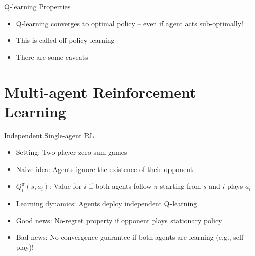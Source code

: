 \documentclass[11pt,aspectratio=169]{beamer}
\begin{document}
  
  \begin{frame}{Q-learning Properties}
   \begin{itemize}
   \setlength{\itemsep}{1em}
    \item Q-learning converges to optimal policy -- even if agent acts sub-optimally!
    \item This is called \alert{off-policy learning}
    \item There are some caveats
   \end{itemize}
  \end{frame}
  
  
 \section{Multi-agent Reinforcement Learning}
  
  
  \begin{frame}{Independent Single-agent RL}
   \begin{itemize}[<+->]
   \setlength{\itemsep}{1.2em}
    \item Setting: Two-player zero-sum games
    \item Naive idea: Agents \alert{ignore} the existence of their opponent
    \item $Q_i^\pi(s,a_i)$: Value for $i$ if both agents follow $\pi$ starting from $s$ and $i$ plays $a_i$
    \item Learning dynamics: Agents deploy \alert{independent Q-learning}
    \item {\color{darkgreen}Good news}: \alert{No-regret} property if opponent plays stationary policy
    \item \alert{Bad news}: No convergence guarantee if both agents are learning (e.g., \alert{self play})!
   \end{itemize}
  \end{frame}
  
\end{document}
